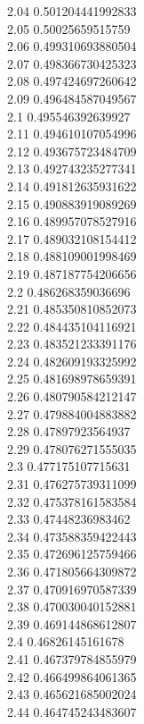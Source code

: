 {2.04	0.501204441992833\\
2.05	0.50025659515759\\
2.06	0.499310693880504\\
2.07	0.498366730425323\\
2.08	0.497424697260642\\
2.09	0.496484587049567\\
2.1	0.495546392639927\\
2.11	0.494610107054996\\
2.12	0.493675723484709\\
2.13	0.492743235277341\\
2.14	0.491812635931622\\
2.15	0.490883919089269\\
2.16	0.489957078527916\\
2.17	0.489032108154412\\
2.18	0.488109001998469\\
2.19	0.487187754206656\\
2.2	0.486268359036696\\
2.21	0.485350810852073\\
2.22	0.484435104116921\\
2.23	0.483521233391176\\
2.24	0.482609193325992\\
2.25	0.481698978659391\\
2.26	0.480790584212147\\
2.27	0.479884004883882\\
2.28	0.47897923564937\\
2.29	0.478076271555035\\
2.3	0.477175107715631\\
2.31	0.476275739311099\\
2.32	0.475378161583584\\
2.33	0.47448236983462\\
2.34	0.473588359422443\\
2.35	0.472696125759466\\
2.36	0.471805664309872\\
2.37	0.470916970587339\\
2.38	0.470030040152881\\
2.39	0.469144868612807\\
2.4	0.46826145161678\\
2.41	0.467379784855979\\
2.42	0.466499864061365\\
2.43	0.465621685002024\\
2.44	0.464745243483607\\
}
